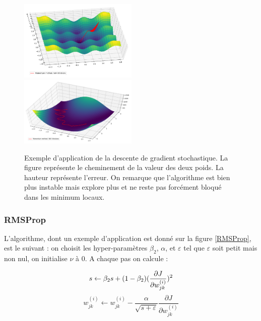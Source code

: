 \begin{figure}[!h]
\centering
\includegraphics[width=160pt]{"images/MLP/descentedegradientnewtonnienne"}
\hspace*{5mm}
\includegraphics[width=160pt]{"images/MLP/descentedegradientnewtonniennepropre"}
\caption{Exemple d'application de la descente de gradient stochastique. La figure représente le cheminement de la valeur des deux poids. La hauteur représente l'erreur. On remarque que l'algorithme est bien plus instable mais explore plus et ne reste pas forcément bloqué dans les minimum locaux.}
\label{descentedegradientnewtonnienne}
\end{figure}

\subsubsection{RMSProp}
L'algorithme, dont un exemple d'application est donné sur la figure \ref{RMSProp}, est le suivant : on choisit les hyper-paramètres $\beta_2$, $\alpha$, et $\varepsilon$ tel que $\varepsilon$ soit petit mais non nul, on initialise $\nu$ à 0.
A chaque pas on calcule :

\begin{displaymath}
s \leftarrow \beta_2 s + (1-\beta_2)  (\frac{\partial J}{\partial w_{jk}^{(i)}})^2 \\
\end{displaymath}
\begin{displaymath}
w_{jk}^{(i)} \leftarrow w_{jk}^{(i)} - \frac{\alpha}{\sqrt{s+\varepsilon}}\frac{\partial J}{\partial w_{jk}^{(i)}}
\end{displaymath}

